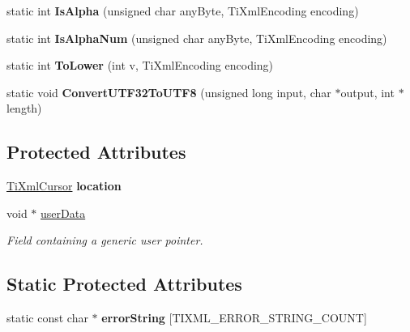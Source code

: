 \begin{DoxyCompactItemize}
\item 
\hypertarget{class_ti_xml_base_ae22522b2e8e1ac43102d16394f639fc8}{
static int {\bfseries IsAlpha} (unsigned char anyByte, TiXmlEncoding encoding)}
\label{class_ti_xml_base_ae22522b2e8e1ac43102d16394f639fc8}

\item 
\hypertarget{class_ti_xml_base_a321919055c115c78ded17f85a793f368}{
static int {\bfseries IsAlphaNum} (unsigned char anyByte, TiXmlEncoding encoding)}
\label{class_ti_xml_base_a321919055c115c78ded17f85a793f368}

\item 
\hypertarget{class_ti_xml_base_a799f17405a86a5c2029618e85f11a097}{
static int {\bfseries ToLower} (int v, TiXmlEncoding encoding)}
\label{class_ti_xml_base_a799f17405a86a5c2029618e85f11a097}

\item 
\hypertarget{class_ti_xml_base_a07c765e3a7f979d343e646ea797b180b}{
static void {\bfseries ConvertUTF32ToUTF8} (unsigned long input, char $\ast$output, int $\ast$length)}
\label{class_ti_xml_base_a07c765e3a7f979d343e646ea797b180b}

\end{DoxyCompactItemize}
\subsection*{Protected Attributes}
\begin{DoxyCompactItemize}
\item 
\hypertarget{class_ti_xml_base_a0d992580f3bc264909f898e942677a3c}{
\hyperlink{struct_ti_xml_cursor}{TiXmlCursor} {\bfseries location}}
\label{class_ti_xml_base_a0d992580f3bc264909f898e942677a3c}

\item 
\hypertarget{class_ti_xml_base_ab242c01590191f644569fa89a080d97c}{
void $\ast$ \hyperlink{class_ti_xml_base_ab242c01590191f644569fa89a080d97c}{userData}}
\label{class_ti_xml_base_ab242c01590191f644569fa89a080d97c}

\begin{DoxyCompactList}\small\item\em Field containing a generic user pointer. \end{DoxyCompactList}\end{DoxyCompactItemize}
\subsection*{Static Protected Attributes}
\begin{DoxyCompactItemize}
\item 
static const char $\ast$ {\bfseries errorString} \mbox{[}TIXML\_\-ERROR\_\-STRING\_\-COUNT\mbox{]}
\end{DoxyCompactItemize}

